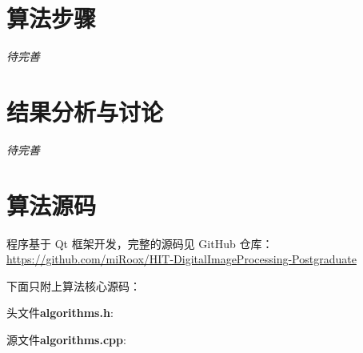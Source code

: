 \documentclass{hitgsrep}
\newcommand{\todo}{{\emph{待完善}\par}}
\begin{document}
\section{算法步骤}

\todo

\section{结果分析与讨论}

\todo

\appendix

\section{算法源码}

程序基于 Qt 框架开发，完整的源码见 GitHub 仓库：\\
\url{https://github.com/miRoox/HIT-DigitalImageProcessing-Postgraduate}

下面只附上算法核心源码：

\noindent 头文件\textbf{algorithms.h}:


\noindent 源文件\textbf{algorithms.cpp}:

\end{document}
